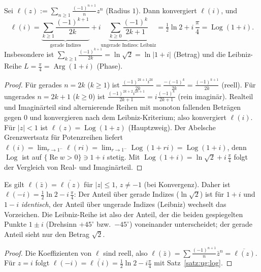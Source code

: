 \begin{satz}\label{satz:ug:log}
Sei $\ell(z):=\sum_{n\ge1}\frac{(-1)^{n+1}}{n}z^n$ (Radius $1$). Dann konvergiert $\ell(i)$, und
\[
\ell(i)=\underbrace{\sum_{k\ge1}\frac{(-1)^{k+1}}{2k}}_{\text{gerade Indizes}}+i\underbrace{\sum_{k\ge0}\frac{(-1)^k}{2k+1}}_{\text{ungerade Indizes: Leibniz}}=\tfrac12\ln2+i\,\frac\pi4=\operatorname{Log}(1+i).
\]
Insbesondere ist $\sum_{k\ge1}\frac{(-1)^{k+1}}{2k}=\ln\sqrt2=\ln|1+i|$ (Betrag) und die Leibniz-Reihe $L=\frac\pi4=\operatorname{Arg}(1+i)$ (Phase).
\end{satz}

\begin{proof}
Für gerades $n=2k$ ($k\ge1$) ist $\frac{(-1)^{2k+1}i^{2k}}{2k}=\frac{-(-1)^k}{2k}=\frac{(-1)^{k+1}}{2k}$ (reell). Für ungerades $n=2k+1$ ($k\ge0$) ist $\frac{(-1)^{2k+2}i^{2k+1}}{2k+1}=i\frac{(-1)^k}{2k+1}$ (rein imaginär). Realteil und Imaginärteil sind alternierende Reihen mit monoton fallenden Beträgen gegen $0$ und konvergieren nach dem Leibniz-Kriterium; also konvergiert $\ell(i)$. Für $|z|<1$ ist $\ell(z)=\operatorname{Log}(1+z)$ (Hauptzweig). Der Abelsche Grenzwertsatz für Potenzreihen \cite{apostol_calculus} liefert $\ell(i)=\lim_{r\to1^-}\ell(ri)=\lim_{r\to1^-}\operatorname{Log}(1+ri)=\operatorname{Log}(1+i)$, denn $\operatorname{Log}$ ist auf $\{\operatorname{Re}w>0\}\ni1+i$ stetig. Mit $\operatorname{Log}(1+i)=\ln\sqrt2+i\,\frac\pi4$ folgt der Vergleich von Real- und Imaginärteil.
\end{proof}

\begin{satz}[Spiegelungsverhalten]\label{satz:ug:konj}
Es gilt $\ell(\bar z)=\overline{\ell(z)}$ für $|z|\le1$, $z\ne-1$ (bei Konvergenz). Daher ist $\ell(-i)=\tfrac12\ln2-i\,\frac\pi4$: Der Anteil über gerade Indizes ($\ln\sqrt2$) ist für $1+i$ und $1-i$ \emph{identisch}, der Anteil über ungerade Indizes (Leibniz) wechselt das Vorzeichen. Die Leibniz-Reihe ist also der Anteil, der die beiden gespiegelten Punkte $1\pm i$ (Drehsinn $+45^\circ$ bzw.\ $-45^\circ$) voneinander unterscheidet; der gerade Anteil sieht nur den Betrag $\sqrt2$.
\end{satz}

\begin{proof}
Die Koeffizienten von $\ell$ sind reell, also $\ell(\bar z)=\sum\frac{(-1)^{n+1}}{n}\bar z^n=\overline{\ell(z)}$. Für $z=i$ folgt $\ell(-i)=\overline{\ell(i)}=\tfrac12\ln2-i\frac\pi4$ mit Satz~\ref{satz:ug:log}.
\end{proof}

